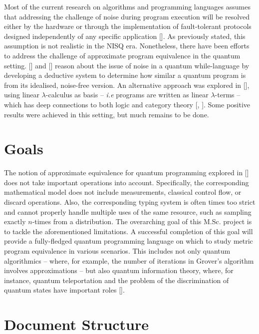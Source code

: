 Most of the current research on algorithms and programming languages assumes that addressing the challenge of noise during program execution will be resolved either by the hardware or through the implementation of fault-tolerant protocols designed independently of any specific application [\cite{chong2017programming}]. As previously stated, this assumption is not realistic in the NISQ era. Nonetheless, there have been efforts to address the challenge of approximate program equivalence in the quantum setting. [\cite{hung2019quantitative}] and [\cite{tao2021gleipnir}] reason about the issue of noise in a quantum while-language by developing a deductive system to determine how similar a quantum program is from its idealised, noise-free version. An alternative approach was explored in [\cite{dahlqvist2022syntactic}], using linear $\lambda$-calculus as basis – \textit{i.e} programs are written as linear $\lambda$-terms – which has deep connections to both logic and category theory [\cite{girard1995advances}, \cite{benton1994mixed}]. Some positive results were achieved in this setting, but much remains to be done.

\section{Goals}
The notion of approximate equivalence for quantum programming explored in [\cite{dahlqvist2022syntactic}] does not take important operations into account. Specifically, the corresponding mathematical model does not include measurements, classical control flow, or discard operations. Also, the corresponding typing system is often times too strict and cannot properly handle multiple uses of the same resource, such as sampling exactly $n$-times from a distribution. The overarching goal of this M.Sc. project is to tackle the aforementioned limitations. A successful completion of this goal will provide a fully-fledged quantum programming language on which to study metric program equivalence in various scenarios. This includes not only quantum algorithmics – where, for example, the number of iterations in Grover’s algorithm involves approximations – but also quantum information theory, where, for instance, quantum teleportation and the problem
of the discrimination of quantum states have important roles [\cite{nielsen2010quantum}].


\section{Document Structure}
